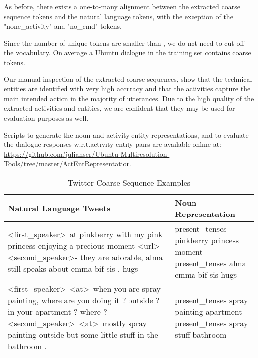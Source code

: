 \documentclass{article}
\begin{document}
As before, there exists a one-to-many alignment between the extracted coarse sequence tokens and the natural language tokens, with the exception of the "none\_activity" and "no\_cmd" tokens.

Since the number of unique tokens are smaller than , we do not need to cut-off the vocabulary. On average a Ubuntu dialogue in the training set contains  coarse tokens.

Our manual inspection of the extracted coarse sequences, show that the technical entities are identified with very high accuracy and that the activities capture the main intended action in the majority of utterances. Due to the high quality of the extracted activities and entities, we are confident that they may be used for evaluation purposes as well. 

Scripts to generate the noun and activity-entity representations, and to evaluate the dialogue responses w.r.t.\@ activity-entity pairs are available online at: \url{https://github.com/julianser/Ubuntu-Multiresolution-Tools/tree/master/ActEntRepresentation}.


\begin{table}[t]
  \caption{Twitter Coarse Sequence Examples}
  \label{TwitterCoarseSeqExamples}
  \centering
  \small
  \begin{tabular}{p{40mm}p{40mm}}
    Natural Language Tweets & Noun Representation \\
    \toprule
    \textless first\_speaker\textgreater \ at pinkberry with my pink princess enjoying a precious moment 	\textless url\textgreater \newline \newline \textless second\_speaker\textgreater - they are adorable, alma still speaks about emma bif sis . hugs  & present\_tenses pinkberry princess moment \newline \newline present\_tenses alma emma bif sis hugs    \\
    \midrule
    \textless first\_speaker\textgreater \  \textless at\textgreater \  when you are spray painting, where are you doing it ? outside ? in your apartment ? where ? \newline \newline
\textless second\_speaker\textgreater \  \textless at\textgreater \  mostly spray painting outside but
some little stuff in the bathroom .
&
present\_tenses spray painting apartment \newline \newline
present\_tenses spray stuff bathroom \\
    \bottomrule
  \end{tabular}
\end{table}
\end{document}
